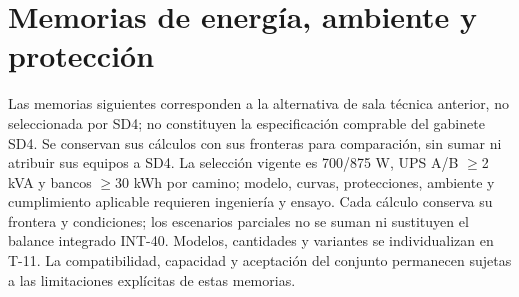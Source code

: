\renewcommand{\thechapter}{A4.3}
\chapter{Memorias de energía, ambiente y protección}
Las memorias siguientes corresponden a la alternativa de sala técnica anterior, no seleccionada por SD4; no constituyen la especificación comprable del gabinete SD4. Se conservan sus cálculos con sus fronteras para comparación, sin sumar ni atribuir sus equipos a SD4. La selección vigente es 700/875 W, UPS A/B $\geq$2 kVA y bancos $\geq$30 kWh por camino; modelo, curvas, protecciones, ambiente y cumplimiento aplicable requieren ingeniería y ensayo. Cada cálculo conserva su frontera y condiciones; los escenarios parciales no se suman ni sustituyen el balance integrado INT-40. Modelos, cantidades y variantes se individualizan en T-11. La compatibilidad, capacidad y aceptación del conjunto permanecen sujetas a las limitaciones explícitas de estas memorias.




































